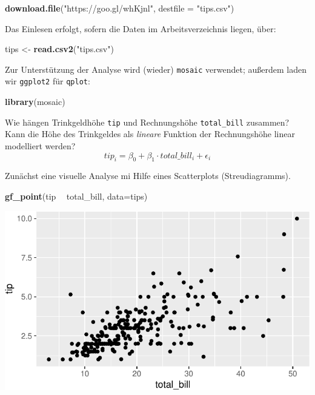 \documentclass[12pt,ngerman,paper=a4,pagesize,DIV=13]{scrreprt}
\newenvironment{Shaded}{\begin{snugshade}}{\end{snugshade}}
\newcommand{\DataTypeTok}[1]{\textcolor[rgb]{0.13,0.29,0.53}{#1}}
\newcommand{\KeywordTok}[1]{\textcolor[rgb]{0.13,0.29,0.53}{\textbf{#1}}}
\newcommand{\NormalTok}[1]{#1}
\newcommand{\OperatorTok}[1]{\textcolor[rgb]{0.81,0.36,0.00}{\textbf{#1}}}
\newcommand{\StringTok}[1]{\textcolor[rgb]{0.31,0.60,0.02}{#1}}
\begin{document}
\begin{Shaded}
\begin{Highlighting}[]
\KeywordTok{download.file}\NormalTok{(}\StringTok{"https://goo.gl/whKjnl"}\NormalTok{, }\DataTypeTok{destfile =} \StringTok{"tips.csv"}\NormalTok{)}
\end{Highlighting}
\end{Shaded}

Das Einlesen erfolgt, sofern die Daten im Arbeitsverzeichnis liegen,
über:

\begin{Shaded}
\begin{Highlighting}[]
\NormalTok{tips <-}\StringTok{ }\KeywordTok{read.csv2}\NormalTok{(}\StringTok{"tips.csv"}\NormalTok{)}
\end{Highlighting}
\end{Shaded}

Zur Unterstützung der Analyse wird (wieder) \texttt{mosaic} verwendet;
außerdem laden wir \texttt{ggplot2} für \texttt{qplot}:

\begin{Shaded}
\begin{Highlighting}[]
\KeywordTok{library}\NormalTok{(mosaic)}
\end{Highlighting}
\end{Shaded}

Wie hängen Trinkgeldhöhe \texttt{tip} und Rechnungshöhe
\texttt{total\_bill} zusammen? Kann die Höhe des Trinkgeldes als
\emph{lineare} Funktion der Rechnungshöhe linear modelliert werden?
\[tip_i=\beta_0+\beta_1\cdot total\_bill_i+\epsilon_i\]

Zunächst eine visuelle Analyse mi Hilfe eines Scatterplots
(Streudiagramms).

\begin{Shaded}
\begin{Highlighting}[]
\KeywordTok{gf_point}\NormalTok{(tip }\OperatorTok{~}\StringTok{ }\NormalTok{total_bill, }\DataTypeTok{data=}\NormalTok{tips)}
\end{Highlighting}
\end{Shaded}

\includegraphics{DatenerhebungStatistik-Uebung_files/figure-latex/unnamed-chunk-160-1.pdf}
\end{document}
